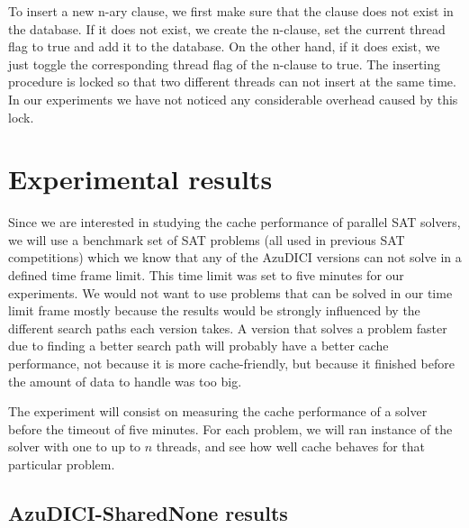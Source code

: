 \documentclass[12pt]{diicc}
\begin{document}
To insert a new n-ary clause, we first make sure that the clause 
does not exist in the database. If it 
does not exist, we create the n-clause, set the current thread 
flag to true and add it to the database. 
On the other hand, if it does exist, we just toggle the 
corresponding thread flag of the n-clause to true. The inserting 
procedure is locked so that two different threads can not insert
at the same time. In our experiments we have not noticed any 
considerable overhead caused by this lock.


\section{Experimental results} 

Since we are interested in studying the cache performance of parallel SAT solvers, we will use a benchmark set of SAT problems (all used in previous SAT competitions) which we know that any of the AzuDICI versions can not solve in a defined time frame limit. This time limit was set to five minutes for our experiments. We would not want to use problems that can be solved in our time limit frame mostly because the results would be strongly influenced by the different search paths each version takes. A version that solves a problem faster due to finding a better search path will probably have a better cache performance, not because it is more cache-friendly, but because it finished before the amount of data to handle was too big.

The experiment will consist on measuring the cache performance of a solver before the timeout of five minutes. For each problem, we will ran instance of the solver with one to up to $n$ threads, and see how well cache behaves for that particular problem.

\subsection{AzuDICI-SharedNone results}
\end{document}
